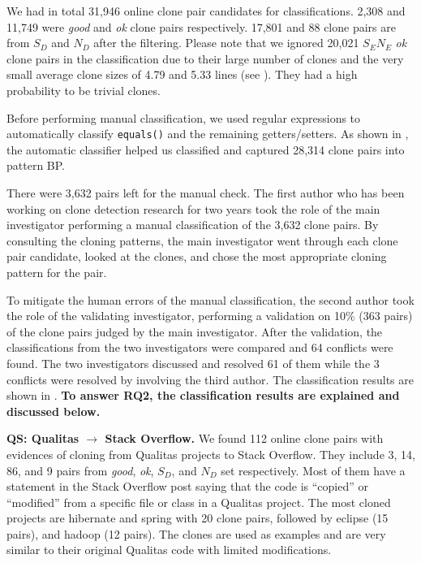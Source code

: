 \documentclass[sigconf,review, anonymous]{acmart}
\begin{document}
We had in total 31,946 online clone pair candidates for classifications. 2,308 and 11,749 were \textit{good} and \textit{ok} clone pairs respectively. 17,801 and 88 clone pairs are from $S_D$ and $N_D$ after the filtering. Please note that we ignored 20,021 $S_EN_E$ \textit{ok} clone pairs in the classification due to their large number of clones and the very small average clone sizes of 4.79 and 5.33 lines (see ). They had a high probability to be trivial clones. 

Before performing manual classification, we used regular expressions to automatically classify {\small\texttt{equals()}} and the remaining getters/setters. As shown in , the automatic classifier helped us classified and captured 28,314 clone pairs into pattern BP. 

There were 3,632 pairs left for the manual check. The first author who has been working on clone detection research for two years took the role of the main investigator performing a manual classification of the 3,632 clone pairs. By consulting the cloning patterns, the main investigator went through each clone pair candidate, looked at the clones, and chose the most appropriate cloning pattern for the pair. %

To mitigate the human errors of the manual classification, the second author took the role of the validating investigator, performing a validation on 10\% (363 pairs) of the clone pairs judged by the main investigator. After the validation, the classifications from the two investigators were compared and 64 conflicts were found. The two investigators discussed and resolved 61 of them while the 3 conflicts were resolved by involving the third author. The classification results are shown in . %
\textbf{To answer RQ2, the classification results are explained and discussed below.}

\textbf{QS: Qualitas $\rightarrow$ Stack Overflow.} We found 112 online clone pairs with evidences of cloning from Qualitas projects to Stack Overflow. They include 3, 14, 86, and 9 pairs from \textit{good}, \textit{ok}, $S_D$, and $N_D$ set respectively. Most of them have a statement in the Stack Overflow post saying that the code is ``copied'' or ``modified'' from a specific file or class in a Qualitas project. The most cloned projects are \textsf{hibernate} and \textsf{spring} with 20 clone pairs, followed by \textsf{eclipse} (15 pairs), and \textsf{hadoop} (12 pairs). The clones are used as examples and are very similar to their original Qualitas code with limited modifications.
\end{document}
